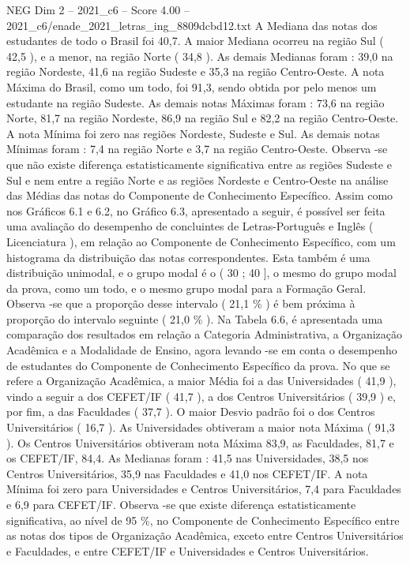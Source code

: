 \begin{textsample}{NEG Dim 2 – 2021\_c6 – Score 4.00 – 2021\_c6/enade\_2021\_letras\_ing\_8809dcbd12.txt}
A Mediana das notas dos estudantes de todo o Brasil foi 40,7.
A maior Mediana ocorreu na região Sul ( 42,5 ), e a menor, na região Norte ( 34,8 ).
As demais Medianas foram : 39,0 na região Nordeste, 41,6 na região Sudeste e 35,3 na região Centro-Oeste.
A nota Máxima do Brasil, como um todo, foi 91,3, sendo obtida por pelo menos um estudante na região Sudeste.
As demais notas Máximas foram : 73,6 na região Norte, 81,7 na região Nordeste, 86,9 na região Sul e 82,2 na região Centro-Oeste.
A nota Mínima foi zero nas regiões Nordeste, Sudeste e Sul.
As demais notas Mínimas foram : 7,4 na região Norte e 3,7 na região Centro-Oeste.
Observa -se que não existe diferença estatisticamente significativa entre as regiões Sudeste e Sul e nem entre a região Norte e as regiões Nordeste e Centro-Oeste na análise das Médias das notas do Componente de Conhecimento Específico.
Assim como nos Gráficos 6.1 e 6.2, no Gráfico 6.3, apresentado a seguir, é possível ser feita uma avaliação do desempenho de concluintes de Letras-Português e Inglês ( Licenciatura ), em relação ao Componente de Conhecimento Específico, com um histograma da distribuição das notas correspondentes.
Esta também é uma distribuição unimodal, e o grupo modal é o ( 30 ; 40 ], o mesmo do grupo modal da prova, como um todo, e o mesmo grupo modal para a Formação Geral.
Observa -se que a proporção desse intervalo ( 21,1 \% ) é bem próxima à proporção do intervalo seguinte ( 21,0 \% ).
Na Tabela 6.6, é apresentada uma comparação dos resultados em relação a Categoria Administrativa, a Organização Acadêmica e a Modalidade de Ensino, agora levando -se em conta o desempenho de estudantes do Componente de Conhecimento Específico da prova.
No que se refere a Organização Acadêmica, a maior Média foi a das Universidades ( 41,9 ), vindo a seguir a dos CEFET/IF ( 41,7 ), a dos Centros Universitários ( 39,9 ) e, por fim, a das Faculdades ( 37,7 ).
O maior Desvio padrão foi o dos Centros Universitários ( 16,7 ).
As Universidades obtiveram a maior nota Máxima ( 91,3 ).
Os Centros Universitários obtiveram nota Máxima 83,9, as Faculdades, 81,7 e os CEFET/IF, 84,4.
As Medianas foram : 41,5 nas Universidades, 38,5 nos Centros Universitários, 35,9 nas Faculdades e 41,0 nos CEFET/IF.
A nota Mínima foi zero para Universidades e Centros Universitários, 7,4 para Faculdades e 6,9 para CEFET/IF.
Observa -se que existe diferença estatisticamente significativa, ao nível de 95 \%, no Componente de Conhecimento Específico entre as notas dos tipos de Organização Acadêmica, exceto entre Centros Universitários e Faculdades, e entre CEFET/IF e Universidades e Centros Universitários.

\end{textsample}
